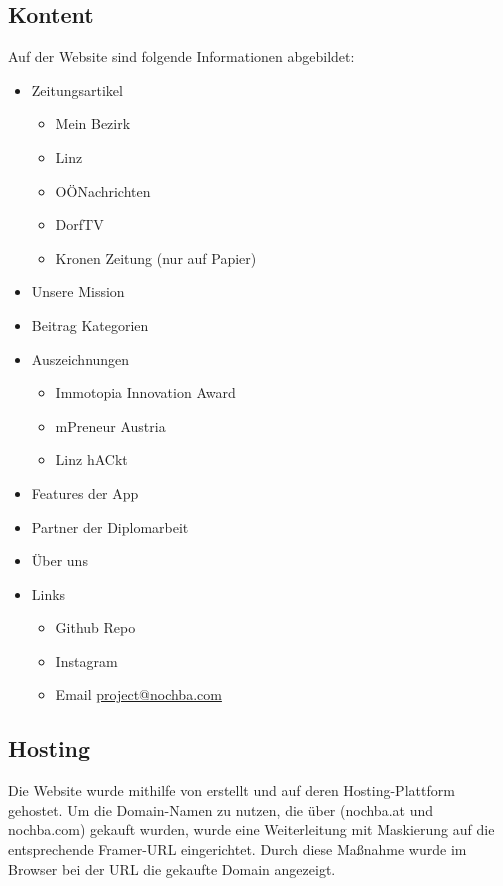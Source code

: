 \subsection{Kontent}
Auf der Website sind folgende Informationen abgebildet:
\begin{itemize}
  \item Zeitungsartikel
        \begin{itemize}
          \item Mein Bezirk\cite{mein_bezirk}
          \item Linz\cite{linz}
          \item OÖNachrichten\cite{oo_nachrichten}
          \item DorfTV\cite{dorf_tv}
          \item Kronen Zeitung (nur auf Papier)
        \end{itemize}
  \item Unsere Mission
  \item Beitrag Kategorien
  \item Auszeichnungen
        \begin{itemize}
          \item Immotopia Innovation Award
          \item mPreneur Austria
          \item Linz hACkt
        \end{itemize}
  \item Features der App
  \item Partner der Diplomarbeit
  \item Über uns
  \item Links
        \begin{itemize}
          \item Github Repo\cite{github_repo}
          \item Instagram\cite{nochba_instagram}
          \item Email \href{mailto:project@nochba.com}{project@nochba.com}
        \end{itemize}
\end{itemize}



\subsection{Hosting}
Die Website wurde mithilfe von \cite{framer} erstellt und auf deren
Hosting-Plattform gehostet. Um die Domain-Namen zu nutzen,
die über \cite{godaddy} (nochba.at und nochba.com) gekauft wurden, wurde eine Weiterleitung
mit Maskierung auf die entsprechende Framer-URL
eingerichtet. Durch diese Maßnahme wurde im Browser bei der
URL die gekaufte Domain angezeigt.


